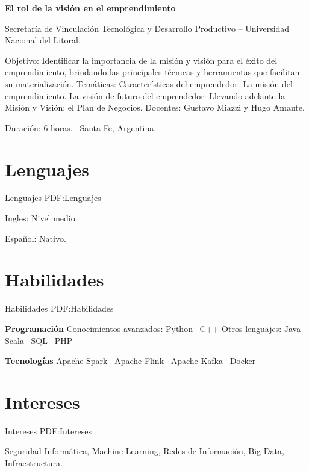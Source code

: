 \documentclass[letterpaper,MMMyyyy,nonstop]{simpleresumecv}
\begin{document}
\begin{body}
\Gap
\textbf{El rol de la visión en el emprendimiento}
\hfill
{}

\BulletItem Secretaría de Vinculación Tecnológica y Desarrollo Productivo – Universidad Nacional del Litoral.
\begin{detail}
	\SubBulletItem
	Objetivo: Identificar la importancia de la misión y visión para el éxito del emprendimiento, brindando las principales técnicas y herramientas que facilitan su materialización.
	\SubBulletItem
	Temáticas: Características del emprendedor. La misión del emprendimiento. La visión de futuro del emprendedor. Llevando adelante la Misión y Visión: el Plan de Negocios.
	\SubBulletItem
	Docentes: Gustavo Miazzi y Hugo Amante. 
\end{detail}
Duración: 6 horas. \SubBulletSymbol\, Santa Fe, Argentina.


\section
{Lenguajes}
{Lenguajes}
{PDF:Lenguajes}

\BulletItem
Ingles: Nivel medio.

\GapNoBreak
\BulletItem
Español: Nativo.


\section
{Habilidades}
{Habilidades}
{PDF:Habilidades}

\textbf{Programación}
\BulletItem
Conocimientos avanzados: Python \SubBulletSymbol\, C++
\BulletItem
Otros lenguajes: Java \SubBulletSymbol\, Scala \SubBulletSymbol\, SQL \SubBulletSymbol\, PHP

\textbf{Tecnologías}
\BulletItem Apache Spark \SubBulletSymbol\, Apache Flink \SubBulletSymbol\, Apache Kafka \SubBulletSymbol\, Docker


\section
{Intereses}
{Intereses}
{PDF:Intereses}

Seguridad Informática, Machine Learning, Redes de Información, Big Data, Infraestructura.


\end{body}
\end{document}
